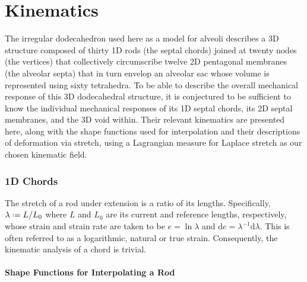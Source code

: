 \part{Kinematics}
\label{partKinematics}

The irregular dodecahedron used here as a model for alveoli describes a 3D structure composed of thirty 1D rods (the septal chords) joined at twenty nodes (the vertices) that collectively circumscribe twelve 2D pentagonal membranes (the alveolar septa) that in turn envelop an alveolar sac whose volume is represented using sixty tetrahedra.  To be able to describe the overall mechanical response of this 3D dodecahedral structure, it is conjectured to be sufficient to know the individual mechanical responses of its 1D septal chords, its 2D septal membranes, and the 3D void within.  Their relevant kinematics are presented here, along with the shape functions used for interpolation and their descriptions of deformation via stretch, using a Lagrangian measure for Laplace stretch \cite{Freedetal20} as our chosen kinematic field.

\section{1D Chords}

The stretch of a rod under extension is a ratio of its lengths.  Specifically, $\lambda \defeq L / L_0$ where $L$ and $L_0$ are its current and reference lengths, respectively, whose strain and strain rate are taken to be $e = \ln \lambda$ and $\mathrm{d} e = \lambda^{-1} \mathrm{d} \lambda$.  This is often referred to as a logarithmic, natural or true strain.  Consequently, the kinematic analysis of a chord is trivial.

\subsection{Shape Functions for Interpolating a Rod}

